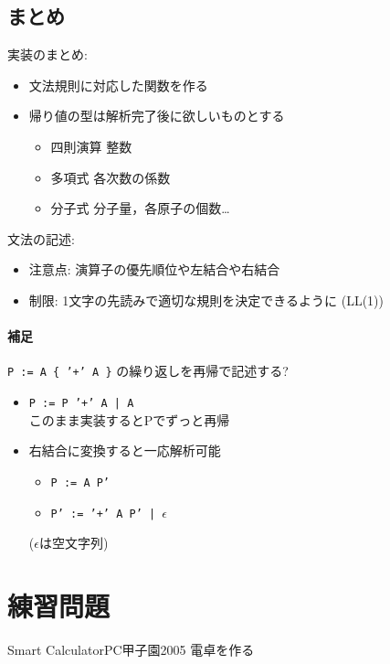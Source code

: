 \subsection{まとめ}
実装のまとめ:
  \begin{itemize}
\setlength{\itemsep}{0pt}
  \item 文法規則に対応した関数を作る
  \item 帰り値の型は解析完了後に欲しいものとする
    \begin{itemize}
\setlength{\itemsep}{0pt}
    \item 四則演算 \dingright 整数
    \item 多項式 \dingright 各次数の係数
    \item 分子式 \dingright 分子量，各原子の個数…
    \end{itemize}
  \end{itemize}

文法の記述:
  \begin{itemize}
\setlength{\itemsep}{0pt}
  \item 注意点: 演算子の優先順位や左結合や右結合
  \item 制限: 1文字の先読みで適切な規則を決定できるように (LL(1))
  \end{itemize}


\paragraph{補足}

\texttt{P := A \{ '+' A \}} の繰り返しを再帰で記述する?
\begin{itemize}
\setlength{\itemsep}{0pt}
\item \texttt{P := P '+' A | A}\\
\dingright このまま実装するとPでずっと再帰
\item 右結合に変換すると一応解析可能
  \begin{itemize}
\setlength{\itemsep}{0pt}
  \item \texttt{P := A P'}
  \item \texttt{P' := '+' A P' | $\epsilon$}
  \end{itemize}
($\epsilon$は空文字列)
\end{itemize}

\section{練習問題}

\begin{pbox}{Smart Calculator}{PC甲子園2005}
電卓を作る

\end{pbox}

